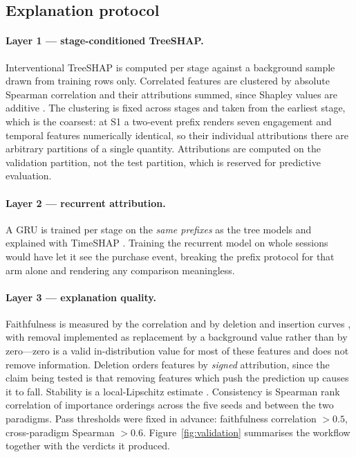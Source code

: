 \documentclass[review,3p,times,authoryear]{elsarticle}   %
\begin{document}
\subsection{Explanation protocol}

\paragraph{Layer 1 --- stage-conditioned TreeSHAP.}
Interventional TreeSHAP \citep{lundberg2020local} is computed per stage against a
background sample drawn from training rows only. Correlated features are clustered
by absolute Spearman correlation and their attributions summed, since Shapley
values are additive \citep{aas2021explaining}. The clustering is fixed across
stages and taken from the earliest stage, which is the coarsest: at S1 a two-event
prefix renders seven engagement and temporal features numerically identical, so
their individual attributions there are arbitrary partitions of a single quantity.
Attributions are computed on the validation partition, not the test partition,
which is reserved for predictive evaluation.

\paragraph{Layer 2 --- recurrent attribution.}
A GRU is trained per stage on the \emph{same prefixes} as the tree models and
explained with TimeSHAP \citep{bento2021timeshap}. Training the recurrent model on
whole sessions would have let it see the purchase event, breaking the prefix
protocol for that arm alone and rendering any comparison meaningless.

\paragraph{Layer 3 --- explanation quality.}
Faithfulness is measured by the \citet{bhatt2020evaluating} correlation and by
deletion and insertion curves \citep{petsiuk2018rise}, with removal implemented as
replacement by a background value rather than by zero---zero is a valid
in-distribution value for most of these features and does not remove information.
Deletion orders features by \emph{signed} attribution, since the claim being tested
is that removing features which push the prediction up causes it to fall. Stability
is a local-Lipschitz estimate \citep{alvarezmelis2018robustness}. Consistency is
Spearman rank correlation of importance orderings across the five seeds and between
the two paradigms. Pass thresholds were fixed in advance: faithfulness correlation
$>0.5$, cross-paradigm Spearman $>0.6$. Figure~\ref{fig:validation} summarises the
workflow together with the verdicts it produced.
\end{document}
